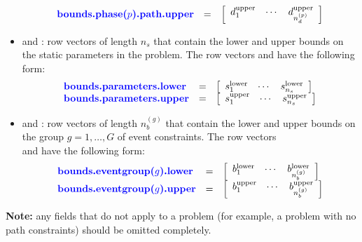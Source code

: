\documentclass[10pt]{article}
\newcommand{\bfblue}[1]{\textrm{{\color{blue}{\bf #1}}}}
\begin{document}
\begin{itemize}
\begin{displaymath}
\begin{array}{lcl}
   \bfblue{bounds.phase($p$).path.upper} & = &
  \left[\begin{array}{ccc} d_{1}^{\textrm{upper}} & \cdots & d_{n_d^{(p)}}^{\textrm{upper}}\end{array}\right]
\end{array}
\end{displaymath}
\item \bfblue{bounds.parameters.lower} and \bfblue{bounds.parameters.upper}:
row vectors of length $n_s$ that contain the lower and upper
bounds on the static parameters in the problem.  The row
vectors \bfblue{bounds.parameters.lower} and 
\bfblue{bounds.parameters.upper} have the following form:
\begin{displaymath}
 \begin{array}{lcl}
   \bfblue{bounds.parameters.lower} & = &
  \left[\begin{array}{ccc} s_{1}^{\textrm{lower}} & \cdots & s_{n_s}^{\textrm{lower}}\end{array}\right] \\
   \bfblue{bounds.parameters.upper} & = &
  \left[\begin{array}{ccc} s_{1}^{\textrm{upper}} & \cdots & s_{n_s}^{\textrm{upper}}\end{array}\right] \\
\end{array}
\end{displaymath}
\item \bfblue{bounds.eventgroup($g$).lower} and \bfblue{bounds.eventgroup($g$).upper}:
row vectors of length $n_b^{(g)}$ that contain the lower and upper
bounds on the group $g=1,\ldots,G$ of event constraints.  The row
vectors \\ \bfblue{bounds.eventgroup($g$).lower} and
\bfblue{bounds.eventgroup($g$).upper} have the following form:
\begin{displaymath}
 \begin{array}{lcl}
   \bfblue{bounds.eventgroup($g$).lower} & = & \left[\begin{array}{ccc} b_{1}^{\textrm{lower}} & \cdots & b_{n_b^{(g)}}^{\textrm{lower}}\end{array}\right] \\
   \bfblue{bounds.eventgroup($g$).upper} & = & \left[\begin{array}{ccc} b_{1}^{\textrm{upper}} & \cdots & b_{n_b^{(g)}}^{\textrm{upper}}\end{array}\right]
\end{array}
\end{displaymath}
\end{itemize}
{\noindent}{\bf Note:} any fields that do not apply to a problem (for
example, a problem with no path constraints) should be omitted
completely.  
\end{document}
